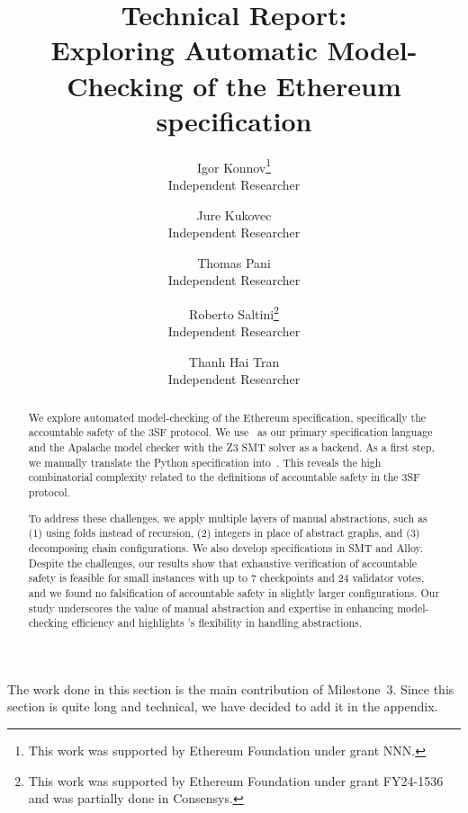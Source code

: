\documentclass[12pt]{article}
\title{Technical Report:\\
       Exploring Automatic Model-Checking of the Ethereum specification}
\author{%
    Igor Konnov\thanks{This work was supported by Ethereum Foundation
    under grant NNN.}\\ \small Independent Researcher \\
    \and
    Jure Kukovec\footnotemark[1] \\ \small Independent Researcher \\
    \and
    Thomas Pani\footnotemark[1] \\ \small Independent Researcher \\
    \and
    Roberto Saltini\thanks{This work was supported by Ethereum Foundation
    under grant FY24-1536 and was partially done in Consensys.} \\ \small Independent Researcher \\
    \and
    Thanh Hai Tran\footnotemark[2] \\ \small Independent Researcher
}
\date{}
\begin{document}
\maketitle

\begin{abstract}

We explore automated model-checking of the Ethereum specification, specifically
the accountable safety of the 3SF protocol. We use~\tlap{} as our primary
specification language and the Apalache model checker with the Z3 SMT solver as
a backend. As a first step, we manually translate the Python specification
into~\tlap{}. This reveals the high combinatorial complexity related to the
definitions of accountable safety in the 3SF protocol.

To address these challenges, we apply multiple layers of manual abstractions,
such as (1) using folds instead of recursion, (2) integers in place of abstract
graphs, and (3) decomposing chain configurations. We also develop
specifications in SMT and Alloy. Despite the challenges, our results show that
exhaustive verification of accountable safety is feasible for small
instances with up to 7 checkpoints and 24 validator votes, and we found no
falsification of accountable safety in slightly larger configurations. Our
study underscores the value of manual abstraction and expertise in enhancing
model-checking efficiency and highlights \tlap{}'s flexibility in handling
abstractions.

\end{abstract}

\setcounter{tocdepth}{2}  %
\tableofcontents

















\pagebreak

\appendix

The work done in this section is the main contribution of Milestone~3. Since
this section is quite long and technical, we have decided to add it in the
appendix.




\end{document}
